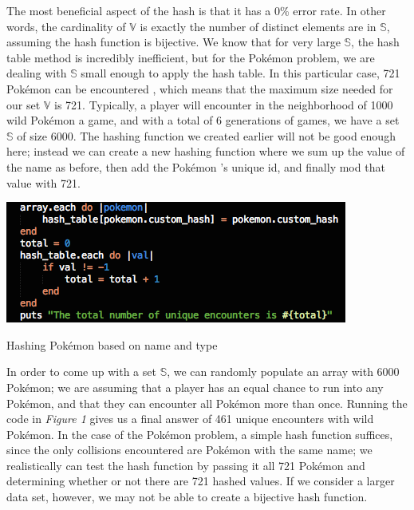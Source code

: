\documentclass{article}
\begin{document}
\indent The most beneficial aspect of the hash is that it has a 0\% error rate. 
In other words, the cardinality of $\mathbb{V}$ is exactly the number of distinct elements are in $\mathbb{S}$, assuming the hash function is bijective. 
We know that for very large $\mathbb{S}$, the hash table method is incredibly inefficient, but for the Pok\'emon problem, we are dealing with $\mathbb{S}$ small enough to apply the hash table. 
In this particular case, 721 Pok\'emon  can be encountered \cite{Pokemon}, which means that the maximum size needed for our set $\mathbb{V}$ is 721. 
Typically, a player will encounter in the neighborhood of 1000 wild Pok\'emon a game, and with a total of 6 generations of games, we have a set $\mathbb{S}$ of size 6000. 
The hashing function we created earlier will not be good enough here; instead we can create a new hashing function where we sum up the value of the name as before, then add the Pok\'emon 's unique id, and finally mod that value with 721.
\begin{floatingfigure}[H!]{8cm}
\centering
\begin{framed}
\includegraphics[scale=0.4]{pkmn_problem/hash_01}
\caption{Hashing Pok\'emon based on name and type}
\end{framed}
\end{floatingfigure}
\noindent In order to come up with a set $\mathbb{S}$, we can randomly populate an array with 6000 Pok\'emon; we are assuming that a player has an equal chance to run into any Pok\'emon, and that they can encounter all Pok\'emon more than once.
Running the code in \textit{Figure 1} gives us a final answer of 461 unique encounters with wild Pok\'emon. 
In the case of the Pok\'emon problem, a simple hash function suffices, since the only collisions encountered are Pok\'emon with the same name; we realistically can test the hash function by passing it all 721 Pok\'emon and determining whether or not there are 721 hashed values.
If we consider a larger data set, however, we may not be able to create a bijective hash function.\\
\end{document}
